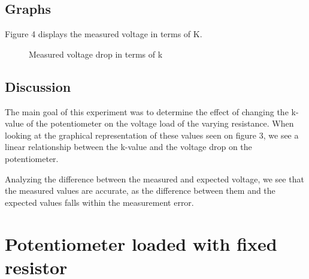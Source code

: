 \documentclass[a4paper]{article}
\newcommand{\unit}[1]{~\mathrm{#1}}
\begin{document}
\subsection{Graphs}
Figure 4 displays the measured voltage in terms of K.
\begin{figure}[!ht]
    \centering
    \caption{Measured voltage drop in terms of k}
    \label{fig:3}
\end{figure}
\subsection{Discussion}
The main goal of this experiment was to determine the effect of changing the
k-value of the potentiometer on the voltage load of the varying resistance. When
looking at the graphical representation of these values seen on figure 3, we see
a linear relationship between the k-value and the voltage drop on the
potentiometer.

Analyzing the difference between the measured and expected
voltage, we see that the measured values are accurate, as the difference between
them and the expected values falls within the measurement error. 
\newpage
\section{Potentiometer loaded with fixed resistor}
\end{document}
